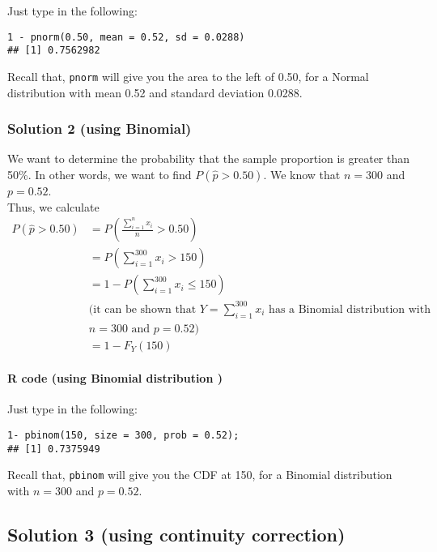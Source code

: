 Just type in the following:

\begin{verbatim}
1 - pnorm(0.50, mean = 0.52, sd = 0.0288)
## [1] 0.7562982
\end{verbatim}

Recall that, \texttt{pnorm} will give you the area to the left of 0.50, for a Normal distribution with mean 0.52 and standard deviation 0.0288.
\subsubsection*{Solution 2 (using Binomial)}

We want to determine the probability that the sample proportion is greater than 50\%. In other words, we want to find $P(\hat{p} > 0.50)$. We know that 
$n = 300$ and $p = 0.52$. \\
Thus, we calculate
\begin{align*}
P(\hat{p} > 0.50) &= P\left(\frac{\sum_{i=1}^{n} x_i}{n} > 0.50\right) \\
&= P\left(\sum_{i=1}^{300} x_i > 150\right) \\
&= 1 - P\left(\sum_{i=1}^{300} x_i \leq 150\right) \\
&\text{(it can be shown that } Y = \sum_{i=1}^{300} x_i \text{ has a Binomial distribution with} \\
&n = 300 \text{ and } p = 0.52\text{)} \\
&= 1 - F_Y(150)
\end{align*}

\paragraph*{R code (using Binomial distribution )}

Just type in the following:

\begin{verbatim}
1- pbinom(150, size = 300, prob = 0.52);
## [1] 0.7375949
\end{verbatim}

Recall that, \texttt{pbinom} will give you the CDF at 150, for a Binomial distribution with $n = 300$ and $p = 0.52$.

\subsection*{Solution 3 (using continuity correction)}


